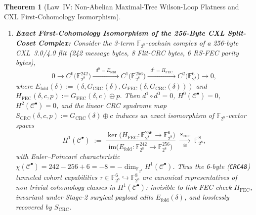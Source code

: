 \documentclass[11pt,letterpaper]{article}
\theoremstyle{spectralthm}
\newtheorem{theorem}{Theorem}[section]
\begin{document}
\begin{theorem}[Law~IV: Non-Abelian Maximal-Tree Wilson-Loop Flatness and CXL First-Cohomology Isomorphism]
\begin{enumerate}
\item \textbf{Exact First-Cohomology Isomorphism of the 256-Byte CXL Split-Coset Complex:} Consider the 3-term $\mathbb{F}_{2^8}$-cochain complex of a 256-byte CXL~3.0/4.0 flit (242 message bytes, 8 Flit-CRC bytes, 6 RS-FEC parity bytes),
\begin{equation}
\label{eq:cxl_cochain_256}
0 \longrightarrow C^0\bigl(\mathbb{F}_{2^8}^{242}\bigr) \xrightarrow{\;\;d^0 = E_{\mathrm{fold}}\;\;} C^1\bigl(\mathbb{F}_{2^8}^{256}\bigr) \xrightarrow{\;\;d^1 = H_{\mathrm{FEC}}\;\;} C^2\bigl(\mathbb{F}_{2^8}^{6}\bigr) \longrightarrow 0,
\end{equation}
where $E_{\mathrm{fold}}(\delta) := (\delta, G_{\mathrm{CRC}}(\delta), G_{\mathrm{FEC}}(\delta, G_{\mathrm{CRC}}(\delta)))$ and $H_{\mathrm{FEC}}(\delta, c, p) := G_{\mathrm{FEC}}(\delta, c) \oplus p$. Then $d^1 \circ d^0 = 0$, $H^0(\mathcal{C}^\bullet) = 0$, $H^2(\mathcal{C}^\bullet) = 0$, and the linear CRC syndrome map $S_{\mathrm{CRC}}(\delta, c, p) := G_{\mathrm{CRC}}(\delta) \oplus c$ induces an exact isomorphism of $\mathbb{F}_{2^8}$-vector spaces
\begin{equation}
\label{eq:h1_isomorphism}
H^1(\mathcal{C}^\bullet) \;:=\; \frac{\ker\bigl(H_{\mathrm{FEC}} : \mathbb{F}_{2^8}^{256} \to \mathbb{F}_{2^8}^{6}\bigr)}{\mathrm{im}\bigl(E_{\mathrm{fold}} : \mathbb{F}_{2^8}^{242} \to \mathbb{F}_{2^8}^{256}\bigr)} \;\xrightarrow[\;\;\cong\;\;]{S_{\mathrm{CRC}}}\; \mathbb{F}_{2^8}^{8},
\end{equation}
with Euler--Poincar\'{e} characteristic $\chi(\mathcal{C}^\bullet) = 242 - 256 + 6 = -8 = -\dim_{\mathbb{F}_{2^8}} H^1(\mathcal{C}^\bullet)$. Thus the 6-byte (\texttt{CRC48}) tunneled cohort capabilities $\tau \in \mathbb{F}_{2^8}^6 \hookrightarrow \mathbb{F}_{2^8}^8$ are canonical representatives of non-trivial cohomology classes in $H^1(\mathcal{C}^\bullet)$: invisible to link FEC check $H_{\mathrm{FEC}}$, invariant under Stage-2 surgical payload edits $E_{\mathrm{fold}}(\delta)$, and losslessly recovered by $S_{\mathrm{CRC}}$.
\end{enumerate}
\end{theorem}
\end{document}
